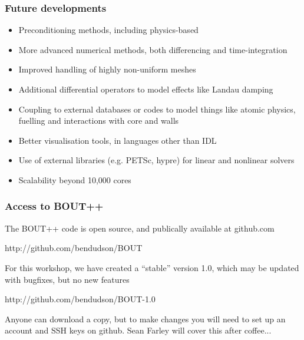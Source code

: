 \documentclass{beamer}
\begin{document}
\begin{frame}
  \frametitle{Future developments}
  
  \begin{itemize}
  \item Preconditioning methods, including physics-based
  \item More advanced numerical methods, both differencing and time-integration
  \item Improved handling of highly non-uniform meshes
  \item Additional differential operators to model effects like Landau damping
  \item Coupling to external databases or codes to model things like atomic
    physics, fuelling and interactions with core and walls
  \item Better visualisation tools, in languages other than IDL
  \item Use of external libraries (e.g. PETSc, hypre) for 
    linear and nonlinear solvers
  \item Scalability beyond 10,000 cores 
  \end{itemize}
\end{frame}

\begin{frame}
  \frametitle{Access to BOUT++}
  
  The BOUT++ code is open source, and publically available at github.com

  \begin{block}
    
    \begin{center}
      http://github.com/bendudson/BOUT
    \end{center}
  \end{block}
  
  For this workshop, we have created a ``stable'' version 1.0, which may be
  updated with bugfixes, but no new features
  
  \begin{block}
    
    \begin{center}
      http://github.com/bendudson/BOUT-1.0
    \end{center}
  \end{block}
  
  Anyone can download a copy, but to make changes you will need to set up
  an account and SSH keys on github. Sean Farley will cover this after coffee...
\end{frame}
\end{document}
